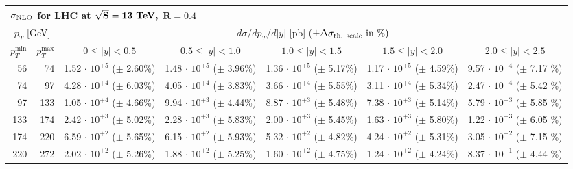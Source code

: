 

\begin{table}[h!]
\renewcommand{\arraystretch}{1.3}
\begin{center}
\begin{tabular}{|r|r|r|r|r|r|r|}
  \hline
  \multicolumn{7}{l}{$\mathbf{\sigma_{\rm NLO}}$ \bf{for LHC at} $\mathbf{\sqrt{S}=13~\mbox{\bf TeV,}}$ $\mathbf{R=0.4}$}\\ 
  \hline
  \hline
\multicolumn{2}{|c|}{$p_T$ [GeV]} &
\multicolumn{5}{|c|}{$d\sigma/dp_T/d|y|$ [pb] \quad ($\pm \Delta \sigma_{\rm th.~scale}~\mbox{in}~\%) $} \\
\multicolumn{1}{|c|}{$p_T^{\min}$} &
\multicolumn{1}{|c|}{$p_T^{\max}$} &
\multicolumn{1}{|c|}{$0 \le |y| < 0.5$} &
\multicolumn{1}{|c|}{$0.5 \le |y| < 1.0$} &
\multicolumn{1}{|c|}{$1.0 \le |y| < 1.5$} &
\multicolumn{1}{|c|}{$1.5 \le |y| < 2.0$} &
\multicolumn{1}{|c|}{$2.0 \le |y| < 2.5$} \\
\hline
%
  56 &   74 & 1.52$\,\cdot\, 10^{+5}$  ($\pm\!\!$  2.60\%) & 1.48$\,\cdot\, 10^{+5}$  ($\pm\!\!$  3.96\%) & 1.36$\,\cdot\, 10^{+5}$  ($\pm\!\!$  5.17\%) & 1.17$\,\cdot\, 10^{+5}$  ($\pm\!\!$  4.59\%) & 9.57$\,\cdot\, 10^{+4}$  ($\pm\!\!$  7.17 \%)\\
  74 &   97 & 4.28$\,\cdot\, 10^{+4}$  ($\pm\!\!$  6.03\%) & 4.05$\,\cdot\, 10^{+4}$  ($\pm\!\!$  3.83\%) & 3.66$\,\cdot\, 10^{+4}$  ($\pm\!\!$  5.55\%) & 3.11$\,\cdot\, 10^{+4}$  ($\pm\!\!$  5.34\%) & 2.47$\,\cdot\, 10^{+4}$  ($\pm\!\!$  5.42 \%)\\
  97 &  133 & 1.05$\,\cdot\, 10^{+4}$  ($\pm\!\!$  4.66\%) & 9.94$\,\cdot\, 10^{+3}$  ($\pm\!\!$  4.44\%) & 8.87$\,\cdot\, 10^{+3}$  ($\pm\!\!$  5.48\%) & 7.38$\,\cdot\, 10^{+3}$  ($\pm\!\!$  5.14\%) & 5.79$\,\cdot\, 10^{+3}$  ($\pm\!\!$  5.85 \%)\\
 133 &  174 & 2.42$\,\cdot\, 10^{+3}$  ($\pm\!\!$  5.02\%) & 2.28$\,\cdot\, 10^{+3}$  ($\pm\!\!$  5.83\%) & 2.00$\,\cdot\, 10^{+3}$  ($\pm\!\!$  5.45\%) & 1.63$\,\cdot\, 10^{+3}$  ($\pm\!\!$  5.80\%) & 1.22$\,\cdot\, 10^{+3}$  ($\pm\!\!$  6.05 \%)\\
 174 &  220 & 6.59$\,\cdot\, 10^{+2}$  ($\pm\!\!$  5.65\%) & 6.15$\,\cdot\, 10^{+2}$  ($\pm\!\!$  5.93\%) & 5.32$\,\cdot\, 10^{+2}$  ($\pm\!\!$  4.82\%) & 4.24$\,\cdot\, 10^{+2}$  ($\pm\!\!$  5.31\%) & 3.05$\,\cdot\, 10^{+2}$  ($\pm\!\!$  7.15 \%)\\
 220 &  272 & 2.02$\,\cdot\, 10^{+2}$  ($\pm\!\!$  5.26\%) & 1.88$\,\cdot\, 10^{+2}$  ($\pm\!\!$  5.25\%) & 1.60$\,\cdot\, 10^{+2}$  ($\pm\!\!$  4.75\%) & 1.24$\,\cdot\, 10^{+2}$  ($\pm\!\!$  4.24\%) & 8.37$\,\cdot\, 10^{+1}$  ($\pm\!\!$  4.44 \%)\\

\end{tabular}
\end{center}
\end{table}
